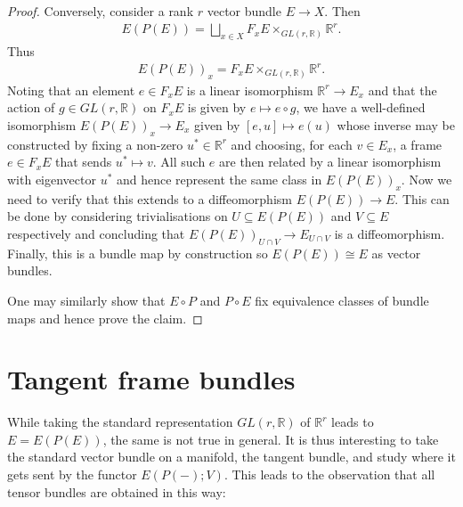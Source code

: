 \documentclass{article}
\begin{document}
\begin{theorem}
\begin{proof}
    Conversely, consider a rank $r$ vector bundle $E\to X$. Then
    \begin{align*}
      E(P(E)) = \bigsqcup_{x\in X} F_x E \times_{GL(r,\mathbb{R})}\mathbb{R}^r.
    \end{align*}
    Thus
    \begin{align*}
      E(P(E))_x = F_x E\times_{GL(r,\mathbb{R})}\mathbb{R}^r.
    \end{align*}
    Noting that an element $e\in F_x E$ is a linear isomorphism
    $\mathbb{R}^r\to E_x$ and that the action of $g\in GL(r,\mathbb{R})$
    on $F_x E$ is given by $e\mapsto e\circ g$,
    we have a well-defined isomorphism $E(P(E))_x\to E_x$ given by
    $[e,u]\mapsto e(u)$ whose inverse may be constructed by fixing
    a non-zero $u^*\in\mathbb{R}^r$ and choosing,
    for each $v\in E_x$, a frame $e\in F_x E$ that sends
    $u^*\mapsto v$. All such $e$ are then related by a linear isomorphism
    with eigenvector $u^*$ and hence represent the same class in
    $E(P(E))_x$.  Now we need to verify that this extends to
    a diffeomorphism $E(P(E))\to E$. This can be done by considering
    trivialisations on $U\subseteq E(P(E))$ and $V\subseteq E$ respectively and
    concluding that $E(P(E))_{U\cap V}\to E_{U\cap V}$ is a diffeomorphism.
    Finally, this is a bundle map by construction so $E(P(E))\cong E$
    as vector bundles.

    One may similarly show that $E\circ P$ and $P\circ E$ fix equivalence
    classes of bundle maps and hence prove the claim.
  \end{proof}
\end{theorem}

\section{Tangent frame bundles}

While taking the standard representation $GL(r,\mathbb{R})$
of $\mathbb{R}^r$ leads to $E=E(P(E))$, the same is not true in general.
It is thus interesting to take the standard vector bundle on a manifold,
the tangent bundle, and study where it gets sent by the functor $E(P(-); V)$.
This leads to the observation that all tensor bundles
are obtained in this way:
\end{document}
